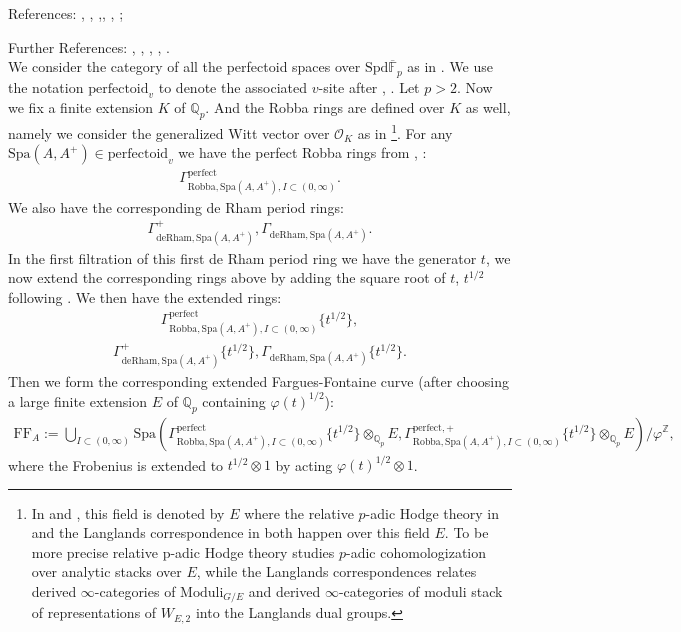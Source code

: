 \documentclass[12pt]{book}
\theoremstyle{definition}
\begin{document}
\noindent References: \cite{FS}, \cite{FF}, \cite{Sch1},\cite{Sch2}, \cite{KL1}, \cite{KL2};

\noindent Further References: \cite{Lan1}, \cite{Drin1}, \cite{Drin2}, \cite{Zhu}, \cite{DHKM}.\\


\noindent We consider the category of all the perfectoid spaces over $\mathrm{Spd}\overline{\mathbb{F}}_p$ as in \cite{FS}. We use the notation $\mathrm{perfectoid}_v$ to denote the associated $v$-site after \cite{FS}, \cite{Sch2}. Let $p>2$. Now we fix a finite extension $K$ of $\mathbb{Q}_p$. And the Robba rings are defined over $K$ as well, namely we consider the generalized Witt vector over $\mathcal{O}_K$ as in \cite{KL2}\footnote{In \cite{FS} and \cite{KL2}, this field is denoted by $E$ where the relative $p$-adic Hodge theory in \cite{KL2} and the Langlands correspondence in \cite{FS} both happen over this field $E$. To be more precise relative p-adic Hodge theory studies $p$-adic cohomologization over analytic stacks over $E$, while the Langlands correspondences relates derived $\infty$-categories of $\mathrm{Moduli}_{G/E}$ and derived $\infty$-categories of moduli stack of representations of $W_{E,2}$ into the Langlands dual groups.}. For any $\mathrm{Spa}(A,A^+)\in \text{perfectoid}_{v}$ we have the perfect Robba rings from \cite{KL1}, \cite{KL2}:
\begin{align}
\Gamma^\text{perfect}_{\text{Robba},\mathrm{Spa}(A,A^+),I\subset (0,\infty)}.
\end{align}
We also have the corresponding de Rham period rings:
\begin{align}
\Gamma^+_{\text{deRham},\mathrm{Spa}(A,A^+)},\Gamma_{\text{deRham},\mathrm{Spa}(A,A^+)}.
\end{align}
In the first filtration of this first de Rham period ring we have the generator $t$, we now extend the corresponding rings above by adding the square root of $t$, $t^{1/2}
$ following \cite{BS}. We then have the extended rings:
\begin{align}
\Gamma^\text{perfect}_{\text{Robba},\mathrm{Spa}(A,A^+),I\subset (0,\infty)}\{t^{1/2}\},
\end{align}
\begin{align}
\Gamma^+_{\text{deRham},\mathrm{Spa}(A,A^+)}\{t^{1/2}\},\Gamma_{\text{deRham},\mathrm{Spa}(A,A^+)}\{t^{1/2}\}.
\end{align}
Then we form the corresponding extended Fargues-Fontaine curve (after choosing a large finite extension $E$ of $\mathbb{Q}_p$ containing $\varphi(t)^{1/2}$):
\begin{align}
\mathrm{FF}_A:=\bigcup_{I\subset (0,\infty)}\mathrm{Spa}(\Gamma^\text{perfect}_{\text{Robba},\mathrm{Spa}(A,A^+),I\subset (0,\infty)}\{t^{1/2}\}\otimes_{\mathbb{Q}_p}E,\Gamma^{\text{perfect},+}_{\text{Robba},\mathrm{Spa}(A,A^+),I\subset (0,\infty)}\{t^{1/2}\}\otimes_{\mathbb{Q}_p}E)/\varphi^\mathbb{Z},
\end{align}
where the Frobenius is extended to $t^{1/2}\otimes 1$ by acting $\varphi(t)^{1/2}\otimes 1$.
\end{document}
